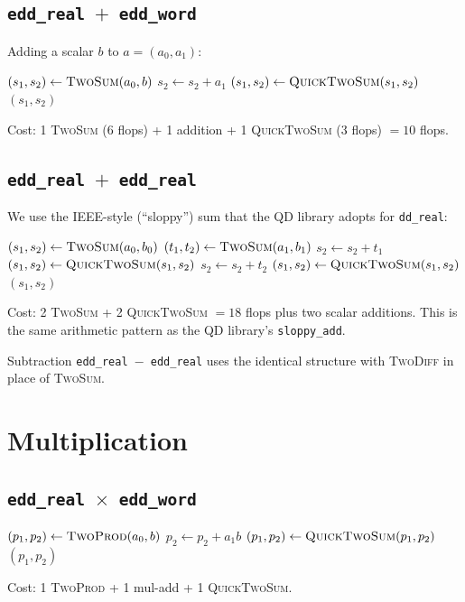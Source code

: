 \documentclass[11pt,a4paper]{article}
\begin{document}
\subsection{\texttt{edd\_real $+$ edd\_word}}

Adding a scalar $b$ to $a = (a_0, a_1)$:
\begin{algorithmic}[1]
\State $(s_1, s_2) \gets \textsc{TwoSum}(a_0, b)$
\State $s_2 \gets s_2 + a_1$
\State $(s_1, s_2) \gets \textsc{QuickTwoSum}(s_1, s_2)$
\State \Return $(s_1, s_2)$
\end{algorithmic}
Cost: 1 \textsc{TwoSum} ($6$ flops) + 1 addition + 1
\textsc{QuickTwoSum} ($3$ flops) $=10$ flops.

\subsection{\texttt{edd\_real $+$ edd\_real}}

We use the IEEE-style (``sloppy'') sum that the QD library adopts
for \texttt{dd\_real}:
\begin{algorithmic}[1]
\State $(s_1, s_2) \gets \textsc{TwoSum}(a_0, b_0)$
\State $(t_1, t_2) \gets \textsc{TwoSum}(a_1, b_1)$
\State $s_2 \gets s_2 + t_1$
\State $(s_1, s_2) \gets \textsc{QuickTwoSum}(s_1, s_2)$
\State $s_2 \gets s_2 + t_2$
\State $(s_1, s_2) \gets \textsc{QuickTwoSum}(s_1, s_2)$
\State \Return $(s_1, s_2)$
\end{algorithmic}
Cost: 2 \textsc{TwoSum} + 2 \textsc{QuickTwoSum} $=18$ flops plus
two scalar additions.  This is the same arithmetic pattern as the
QD library's \texttt{sloppy\_add}.

Subtraction \texttt{edd\_real $-$ edd\_real} uses the identical
structure with \textsc{TwoDiff} in place of \textsc{TwoSum}.

\section{Multiplication}
\label{sec:mul}

\subsection{\texttt{edd\_real $\times$ edd\_word}}

\begin{algorithmic}[1]
\State $(p_1, p_2) \gets \textsc{TwoProd}(a_0, b)$
\State $p_2 \gets p_2 + a_1 b$
\State $(p_1, p_2) \gets \textsc{QuickTwoSum}(p_1, p_2)$
\State \Return $(p_1, p_2)$
\end{algorithmic}
Cost: 1 \textsc{TwoProd} + 1 mul-add + 1 \textsc{QuickTwoSum}.
\end{document}

